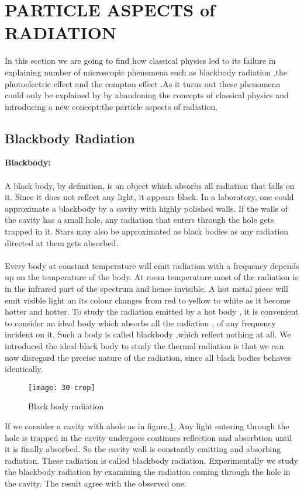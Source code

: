   \section{PARTICLE ASPECTS of RADIATION}
  In this section we are going to find how classical physics led to its failure in explaining number of microscopic phenomena such as blackbody radiation ,the photoelectric effect and the compton effect .As it turns out these phenomena could only be explained by by abandoning the concepts of classical physics and introducing a new concept:the particle aspects of radiation.
  \subsection{Blackbody Radiation}
  {\textbf{\large Blackbody:}}\\\\
  A black body, by definition, is an object which absorbs all radiation that falls on it. Since it does not reflect any light, it appears black. In a laboratory, one could approximate a blackbody by a cavity with highly polished walls. If the walls of the cavity has a small hole, any radiation that enters through the hole gets trapped in it. Stars may also be approximated as black bodies as any radiation directed at them gets absorbed.\\\\
  Every  body at constant temperature will emit radiation with a frequency depends up on the temperature of the body. At room temperature most of the radiation is in the infrared part of the spectrum and hence invisible. A hot metal piece will emit visible light an its colour changes from red to yellow to white as it become hotter and hotter. To study the radiation emitted by a hot body , it is convenient to consider an ideal body  which absorbs all the radiation , of any frequency incident on it. Such a body is called blackbody  ,which reflect nothing at all. We introduced the ideal black body to study the thermal radiation is that we can now disregard the precise nature of the radiation, since all black bodies behaves identically.\\
  \begin{figure}[H]
  	\centering
  	\texttt{[image: 30-crop]}
  	\caption{Black body radiation}
  	\label{Black body radiation}
  \end{figure}
  If we consider a cavity with ahole  as in figure.\ref{Black body radiation}, Any light entering through the hole is trapped in the cavity undergoes continues reflection and absorbtion until it is finally absorbed. So the cavity wall is constantly emitting and absorbing radiation. These radiation is called blackbody radiation. Experimentally we study the blackbody radiation by examining the radiation coming through the hole in the cavity. The result agree with the observed one.
